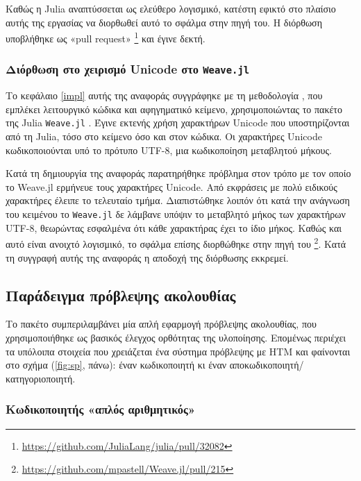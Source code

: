 	Καθώς η Julia αναπτύσσεται ως ελεύθερο λογισμικό, κατέστη εφικτό στο πλαίσιο αυτής της εργασίας να διορθωθεί αυτό το σφάλμα στην πηγή του.
	Η διόρθωση υποβλήθηκε ως «pull request» \footnote{\url{https://github.com/JuliaLang/julia/pull/32082}} και έγινε δεκτή.

	\subsubsection{Διόρθωση στο χειρισμό Unicode στο \texttt{Weave.jl}}

	Το κεφάλαιο \ref{impl} αυτής της αναφοράς συγγράφηκε με τη μεθοδολογία
	 \parencite{knuthLiterateProgramming1984},
	που εμπλέκει λειτουργικό κώδικα και αφηγηματικό κείμενο,
	χρησιμοποιώντας το πακέτο της Julia \texttt{Weave.jl} \cite{pastellWeaveJlScientific2017}.
	Έγινε εκτενής χρήση χαρακτήρων Unicode που υποστηρίζονται από τη Julia, τόσο στο κείμενο όσο και στον κώδικα.
	Οι χαρακτήρες Unicode κωδικοποιούνται υπό το πρότυπο UTF-8, μια κωδικοποίηση μεταβλητού μήκους.

	Κατά τη δημιουργία της αναφοράς παρατηρήθηκε πρόβλημα στον τρόπο με τον οποίο το Weave.jl ερμήνευε τους χαρακτήρες Unicode.
	Από εκφράσεις με πολύ ειδικούς χαρακτήρες έλειπε το τελευταίο τμήμα.
	Διαπιστώθηκε λοιπόν ότι κατά την ανάγνωση του κειμένου το \texttt{Weave.jl} δε λάμβανε υπόψιν το μεταβλητό μήκος των χαρακτήρων UTF-8,
	θεωρώντας εσφαλμένα ότι κάθε χαρακτήρας έχει το ίδιο μήκος.
	Καθώς και αυτό είναι ανοιχτό λογισμικό, το σφάλμα επίσης διορθώθηκε στην πηγή του
	\footnote{\url{https://github.com/mpastell/Weave.jl/pull/215}}.
	Κατά τη συγγραφή αυτής της αναφοράς η αποδοχή της διόρθωσης εκκρεμεί.

\subsection{Παράδειγμα πρόβλεψης ακολουθίας} \label{conc:intro-tspred}

	Το πακέτο συμπεριλαμβάνει μία απλή εφαρμογή πρόβλεψης ακολουθίας, που χρησιμοποιήθηκε ως βασικός έλεγχος ορθότητας της υλοποίησης.
	Επομένως περιέχει τα υπόλοιπα στοιχεία που χρειάζεται ένα σύστημα πρόβλεψης με HTM και φαίνονται στο σχήμα (\ref{fig:sp}, πάνω):
	έναν κωδικοποιητή κι έναν αποκωδικοποιητή/κατηγοριοποιητή.

	\subsubsection{Κωδικοποιητής «απλός αριθμητικός»}

